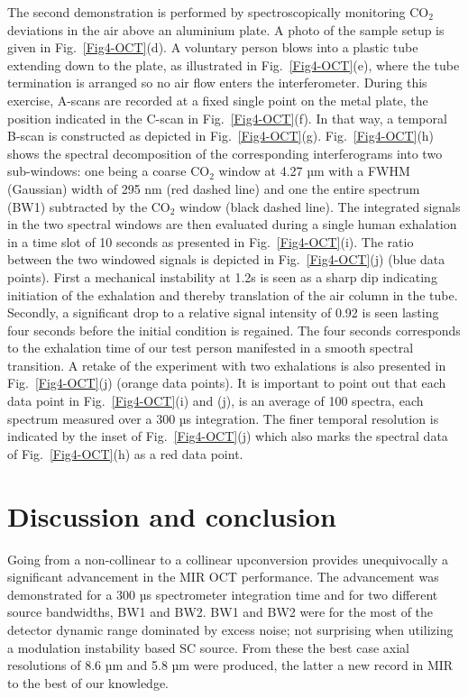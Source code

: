 \documentclass[9pt,twocolumn]{extarticle}
\begin{document}
The second demonstration is performed by spectroscopically monitoring CO$_2$ deviations in the air above an aluminium plate. A photo of the sample setup is given in Fig.~\ref{Fig4-OCT}(d). A voluntary person blows into a plastic tube extending down to the plate, as illustrated in Fig.~\ref{Fig4-OCT}(e), where the tube termination is arranged so no air flow enters the interferometer. During this exercise, A-scans are recorded at a fixed single point on the metal plate, the position indicated in the C-scan in Fig.~\ref{Fig4-OCT}(f). In that way, a temporal B-scan is constructed as depicted in Fig.~\ref{Fig4-OCT}(g). Fig.~\ref{Fig4-OCT}(h) shows the spectral decomposition of the corresponding interferograms into two sub-windows: one being a coarse CO$_2$ window at 4.27 µm with a FWHM (Gaussian) width of 295 nm (red dashed line) and one the entire spectrum (BW1) subtracted by the CO$_2$ window (black dashed line). The integrated signals in the two spectral windows are then evaluated during a single human exhalation in a time slot of 10 seconds as presented in Fig.~\ref{Fig4-OCT}(i). The ratio between the two windowed signals is depicted in Fig.~\ref{Fig4-OCT}(j) (blue data points). First a mechanical instability at 1.2s is seen as a sharp dip indicating initiation of the exhalation and thereby translation of the air column in the tube. Secondly, a significant drop to a relative signal intensity of 0.92 is seen lasting four seconds before the initial condition is regained. The four seconds corresponds to the exhalation time of our test person manifested in a smooth spectral transition. A retake of the experiment with two exhalations is also presented in Fig.~\ref{Fig4-OCT}(j) (orange data points). It is important to point out that each data point in Fig.~\ref{Fig4-OCT}(i) and (j), is an average of 100 spectra, each spectrum measured over a 300 µs integration. The finer temporal resolution is indicated by the inset of Fig.~\ref{Fig4-OCT}(j) which also marks the spectral data of Fig.~\ref{Fig4-OCT}(h) as a red data point.

\section{Discussion and conclusion}
Going from a non-collinear to a collinear upconversion provides unequivocally a significant advancement in the MIR OCT performance. The advancement was demonstrated for a 300 µs spectrometer integration time and for two different source bandwidths, BW1 and BW2.
BW1 and BW2 were for the most of the detector dynamic range dominated by excess noise; not surprising when utilizing a modulation instability based SC source. From these the best case axial resolutions of 8.6 µm and 5.8 µm were produced, the latter a new record in MIR to the best of our knowledge. 
\end{document}
